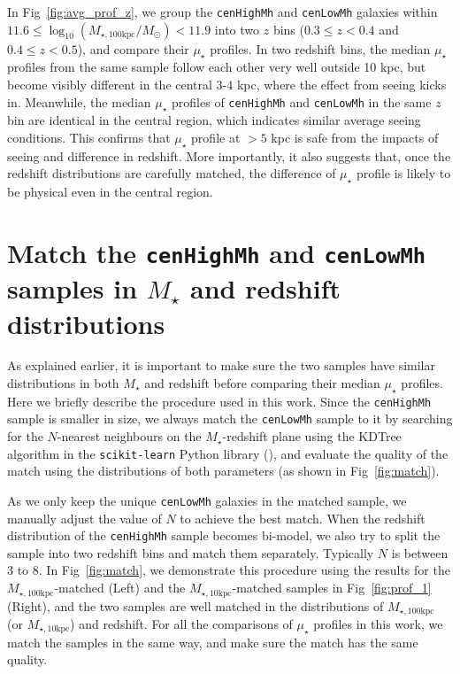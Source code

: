 \documentclass[a4paper,fleqn,usenatbib]{mnras}
\def\rbcg{\texttt{cenHighMh}}
\def\nbcg{\texttt{cenLowMh}}
\def\mstar{{$M_{\star}$}}
\def\minn{{$M_{\star,10\mathrm{kpc}}$}}
\def\mtot{{$M_{\star,100\mathrm{kpc}}$}}
\def\logmtot{{$\log_{10} (M_{\star,100\mathrm{kpc}}/M_{\odot})$}}
\def\mden{{$\mu_{\star}$}}
\begin{document}
    In Fig~\ref{fig:avg_prof_z}, we group the \rbcg{} and \nbcg{} galaxies within 
    $11.6 \le$\logmtot$< 11.9$ into two $z$ bins ($0.3\leq z<0.4$ and $0.4\leq z<0.5$),
    and compare their \mden{} profiles. 
    In two redshift bins, the median \mden{} profiles from the same sample follow each 
    other very well outside 10 kpc, but become visibly different in the central 3-4 kpc,
    where the effect from seeing kicks in. 
    Meanwhile, the median \mden{} profiles of \rbcg{} and \nbcg{} in the same $z$ bin 
    are identical in the central region, which indicates similar average seeing 
    conditions.       
    This confirms that \mden{} profile at $> 5$ kpc is safe from the impacts of seeing 
    and difference in redshift.
    More importantly, it also suggests that, once the redshift distributions are 
    carefully matched, the difference of \mden{} profile is likely to be physical 
    even in the central region.  

\section{Match the \rbcg{} and \nbcg{} samples in \mstar{} and redshift distributions}
    \label{app:match} 


    As explained earlier, it is important to make sure the two samples have similar 
    distributions in both \mstar{} and redshift before comparing their median \mden{} 
    profiles.  
    Here we briefly describe the procedure used in this work. 
    Since the \rbcg{} sample is smaller in size, we always match the \nbcg{} sample to 
    it by searching for the $N$-nearest neighbours on the $M_{\star}$-redshift plane 
    using the KDTree algorithm in the \texttt{scikit-learn} Python library 
    (\citealt{scikit-learn}), and evaluate the quality of the match using the 
    distributions of both parameters (as shown in Fig~\ref{fig:match}). 
 
    As we only keep the unique \nbcg{} galaxies in the matched sample, we manually 
    adjust the value of $N$ to achieve the best match. 
    When the redshift distribution of the \rbcg{} sample becomes bi-model, we also try 
    to split the sample into two redshift bins and match them separately. 
    Typically $N$ is between 3 to 8.
    In Fig~\ref{fig:match}, we demonstrate this procedure using the results for 
    the \mtot{}-matched (Left) and the \minn{}-matched samples in Fig~\ref{fig:prof_1}
    (Right), and the two samples are well matched in the distributions of \mtot{}
    (or \minn{}) and redshift.  
    For all the comparisons of \mden{} profiles in this work, we match the samples 
    in the same way, and make sure the match has the same quality. 
\end{document}
